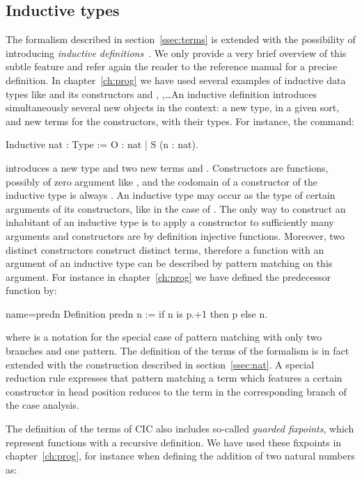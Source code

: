 \subsection{Inductive types}\label{ssec:indtypes}

The formalism described in section~\ref{ssec:terms} is extended with
the possibility of introducing
\emph{inductive definitions}~\cite{CoPa89, Moh93}. We only provide a
very brief overview of this subtle feature and refer again the reader
to the reference manual for a precise definition.
In chapter~\ref{ch:prog} we have used several examples of inductive
data types like  and its constructors  and ,
,\ldots An inductive definition introduces simultaneously
several new objects in the context: a new type, in a given sort, and
new terms for the constructors, with their types. For instance, the
command:

\begin{coq}{}{}
Inductive nat : Type := O : nat | S (n : nat).
\end{coq}
introduces a new type  and two new terms  and
. Constructors are functions, possibly of zero
argument like , and the codomain of a constructor of the
inductive type  is always . An inductive type may occur as
the type of certain arguments of its constructors, like in the case of
. The only way to construct an inhabitant of an
inductive type is to apply a constructor to sufficiently many
arguments and constructors are by definition injective functions.
Moreover, two distinct constructors construct distinct
terms, therefore a function with an argument of an inductive type can be
described by pattern matching on this argument. For instance in
chapter~\ref{ch:prog} we have defined the predecessor function by:

\begin{coq}{name=predn}{}
Definition predn n := if n is p.+1 then p else n.
\end{coq}
where  is a notation for the special case of
pattern matching with only two branches and one pattern. The definition of
the terms of the formalism is in fact extended with the
 construction described in
section~\ref{ssec:nat}. A special reduction rule expresses that
pattern matching a term which features a certain constructor in head
position reduces to the term in the corresponding branch of the case
analysis.

The definition of the terms of CIC also includes so-called
\emph{guarded fixpoints}, which represent functions with a recursive
definition. We have used these fixpoints in chapter~\ref{ch:prog}, for
instance when defining the addition of two natural numbers as:

